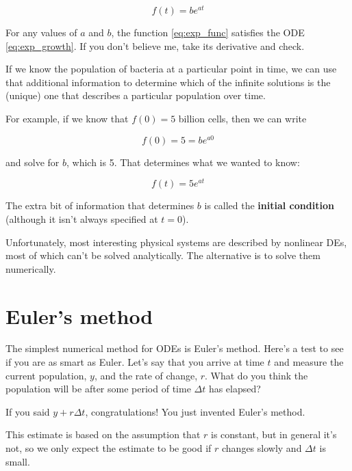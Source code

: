 \documentclass[
]{book}
\begin{document}
\begin{equation}\label{eq:exp_func}
f(t) = b e^{at}
\end{equation}


For any values of $a$ and $b$, the function \eqref{eq:exp_func} satisfies
the ODE \eqref{eq:exp_growth}.  If you don't believe me, take its
derivative and check.

If we know the population of bacteria at a particular point in time,
we can use that additional information to determine which of the
infinite solutions is the (unique) one that describes a particular
population over time.

For example, if we know that $f(0) = 5$ billion cells, then we
can write

\begin{equation}
f(0) = 5 = b e^{a 0}
\end{equation}


and solve for $b$, which is 5.  That determines what we wanted
to know:

\begin{equation}
f(t) = 5 e^{at}
\end{equation}


The extra bit of information that determines $b$ is called
the {\bf initial condition} (although it isn't always specified
at $t=0$).

Unfortunately, most interesting physical systems are described by
nonlinear DEs, most of which can't be solved analytically.  The
alternative is to solve them numerically.


\section{Euler's method}

The simplest numerical method for ODEs is Euler's
method.  Here's a test to
see if you are as smart as Euler.  Let's say that you
arrive at time $t$ and measure the current population, $y$, and
the rate of change, $r$.  What do you think the population will
be after some period of time $\Delta t$ has elapsed?

If you said $y + r \Delta t$, congratulations!  You just invented
Euler's method.

This estimate is based on the assumption that $r$ is constant, but
in general it's not, so we only expect the estimate to be good if
$r$ changes slowly and $\Delta t$ is small.
\end{document}
